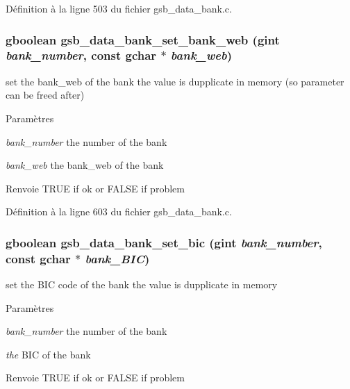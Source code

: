 Définition à la ligne 503 du fichier gsb\_\-data\_\-bank.c.

\subsubsection[{gsb\_\-data\_\-bank\_\-set\_\-bank\_\-web}]{\setlength{\rightskip}{0pt plus 5cm}gboolean gsb\_\-data\_\-bank\_\-set\_\-bank\_\-web (gint {\em bank\_\-number}, \/  const gchar $\ast$ {\em bank\_\-web})}\label{gsb__data__bank_8c_ab601e5c8cd28a7956089b06c7198f435}
set the bank\_\-web of the bank the value is dupplicate in memory (so parameter can be freed after)


\begin{DoxyParams}{Paramètres}
\item[{\em bank\_\-number}]the number of the bank \item[{\em bank\_\-web}]the bank\_\-web of the bank\end{DoxyParams}
\begin{DoxyReturn}{Renvoie}
TRUE if ok or FALSE if problem 
\end{DoxyReturn}


Définition à la ligne 603 du fichier gsb\_\-data\_\-bank.c.

\subsubsection[{gsb\_\-data\_\-bank\_\-set\_\-bic}]{\setlength{\rightskip}{0pt plus 5cm}gboolean gsb\_\-data\_\-bank\_\-set\_\-bic (gint {\em bank\_\-number}, \/  const gchar $\ast$ {\em bank\_\-BIC})}\label{gsb__data__bank_8c_aa021dbe34eec317be81c19956e49519c}
set the BIC code of the bank the value is dupplicate in memory


\begin{DoxyParams}{Paramètres}
\item[{\em bank\_\-number}]the number of the bank \item[{\em the}]BIC of the bank\end{DoxyParams}
\begin{DoxyReturn}{Renvoie}
TRUE if ok or FALSE if problem 
\end{DoxyReturn}


